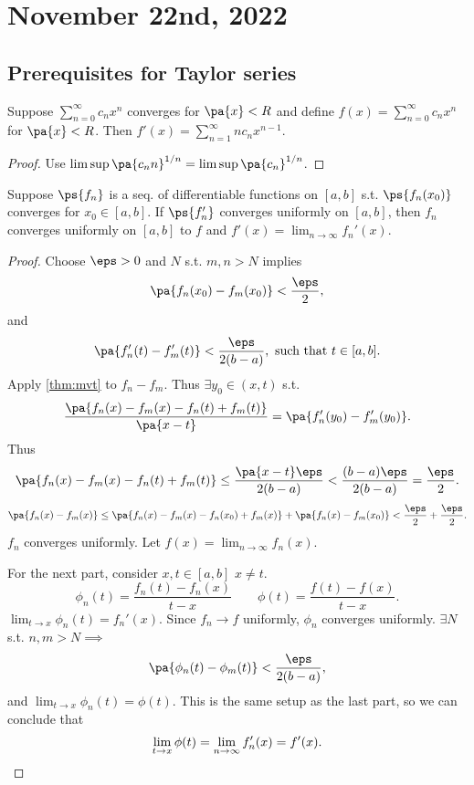 \documentclass[11pt]{scrartcl}
\numberwithin{equation}{section}
\begin{document}
\section{November 22nd, 2022}
\subsection{Prerequisites for Taylor series}
\begin{theorem}
    Suppose $\sum_{n=0}^{\infty}c_nx^n$ converges for $\pa{x}<R$ 
    and define $f(x)=\sum_{n=0}^{\infty}c_nx^n$ for $\pa{x}<R$.
    Then $f'(x) = \sum_{n=1}^{\infty}nc_nx^{n-1}$.
\end{theorem}
\begin{proof}
    Use $\limsup \pa{c_nn}^{1/n} = \limsup \pa{c_n}^{1/n}$.
\end{proof}
\begin{theorem}
    Suppose $\ps{f_n}$ is a seq. of differentiable functions on $[a,b]$ s.t.
    $\ps{f_n(x_0)}$ converges for $x_0\in [a,b]$. If $\ps{f_n'}$ converges 
    uniformly on $[a,b]$, then $f_n$ converges uniformly on $[a,b]$ 
    to $f$ and $f'(x) = \lim_{n\rightarrow \infty}f_n'(x)$.
\end{theorem}
\begin{proof}
    Choose $\eps>0$ and $N$ s.t. $m,n>N$ implies 
    \[
        \pa{f_n(x_0)-f_m(x_0)} < \frac{\eps}{2},
    \]
    and 
    \[
        \pa{f_n'(t)-f_m'(t)} < \frac{\eps}{2(b-a)}, \text{ such that } t\in [a,b].
    \]
    Apply \cref{thm:mvt} to $f_n-f_m$. Thus $\exists y_0 \in (x,t)$
    s.t. 
    \[
        \frac{\pa{f_n(x)-f_m(x) - f_n(t)+f_m(t)}}{\pa{x-t}} = \pa{f_n'(y_0)-f_m'(y_0)}.
    \]
    Thus 
    \[
        \pa{f_n(x)-f_m(x) - f_n(t)+f_m(t)} \leq \frac{\pa{x-t}\eps}{2(b-a)} < \frac{(b-a)\eps}{2(b-a)} = \frac{\eps}{2}.
    \]
    \[
        \pa{f_n(x)-f_m(x)} \leq \pa{f_n(x)-f_m(x) - f_n(x_0)+f_m(x)} + \pa{f_n(x)-f_m(x_0)} < \frac{\eps}{2}+\frac{\eps}{2}.
    \]
    $f_n$ converges uniformly. Let $f(x)=\lim_{n\rightarrow \infty}f_n(x)$.

    For the next part, consider $x,t \in [a,b]$ $x\neq t$.
    \[
        \phi_n(t) = \frac{f_n(t)-f_n(x)}{t-x} \qquad \phi(t) = \frac{f(t)-f(x)}{t-x}.
    \]
    $\lim_{t\rightarrow x}\phi_n(t) = f_n'(x)$. Since $f_n\to f$ uniformly,
     $\phi_n$ converges uniformly. $\exists N$ s.t. $n,m>N\implies $
    \[
        \pa{\phi_n(t)-\phi_m(t)} < \frac{\eps}{2(b-a)},
    \]
    and $\lim_{t\rightarrow x}\phi_n(t) = \phi(t)$.
    This is the same setup as the last part, so we can conclude that 
    \[
        \lim_{t\rightarrow x}\phi(t) = \lim_{n\rightarrow \infty}f_n'(x)=f'(x).
        \qedhere
    \]
\end{proof}
\end{document}
